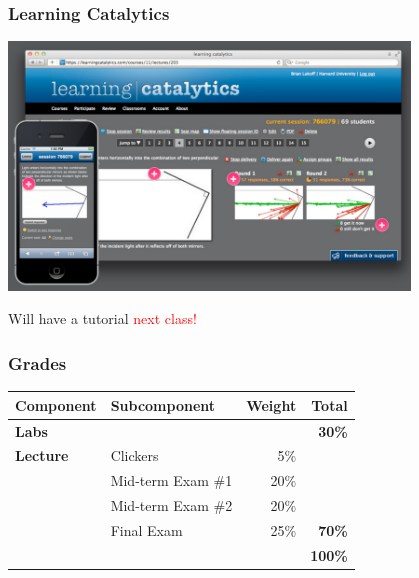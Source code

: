 \documentclass[10pt]{beamer}
\begin{document}
\begin{frame}[t]
\frametitle{Learning Catalytics}
\vspace{0.25cm}

	\begin{center}
		\includegraphics[width=0.8\textwidth]{figures/learning.png}
		
		\vspace{0.25cm}
		
		Will have a tutorial \textcolor{red}{next class!}
	\end{center}

\end{frame}


\begin{frame}[t]
\frametitle{Grades}
\vspace{0.5cm}

	\begin{center}
		\begin{tabular}{l l r r}
			\textbf{Component} & \textbf{Subcomponent} & \textbf{Weight} & \textbf{Total}\\
			\midrule
				\textbf{Labs} &  & & \textbf{30\%}\\
			\midrule
				\textbf{Lecture} & Clickers & 5\% &\\
				& Mid-term Exam \#1 & 20\% &\\
				& Mid-term Exam \#2 & 20\% &\\
				& Final Exam & 25\% & \textbf{70\%}\\
			\midrule
				& & & \textbf{100\%}					
		\end{tabular}
	\end{center}	
\end{frame}
\end{document}
